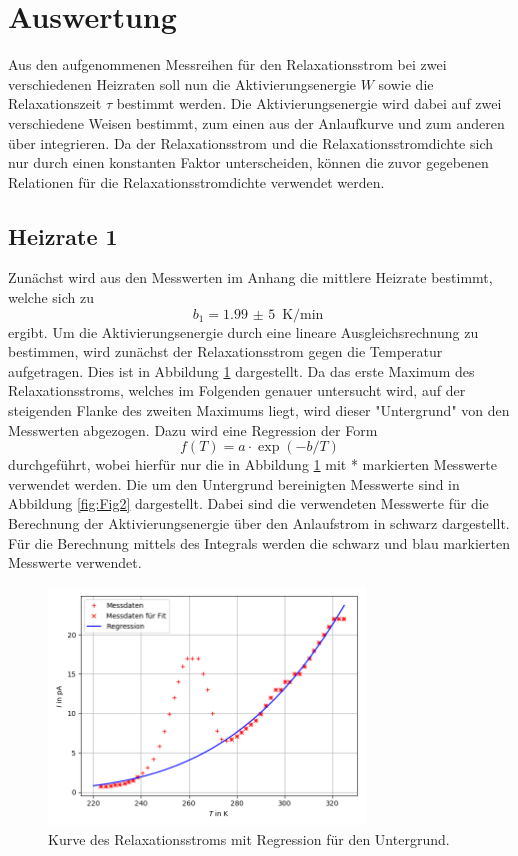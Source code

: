 \section{Auswertung}
Aus den aufgenommenen Messreihen für den Relaxationsstrom bei zwei verschiedenen Heizraten soll
nun die Aktivierungsenergie $W$ sowie die Relaxationszeit $\tau$ bestimmt werden. Die Aktivierungsenergie
wird dabei auf zwei verschiedene Weisen bestimmt, zum einen aus der Anlaufkurve und zum anderen
über integrieren. Da der Relaxationsstrom und die Relaxationsstromdichte sich nur durch einen
konstanten Faktor unterscheiden, können die zuvor gegebenen Relationen für die Relaxationsstromdichte
verwendet werden.

\subsection{Heizrate 1}
Zunächst wird aus den Messwerten im Anhang die mittlere Heizrate bestimmt, welche
sich zu
\begin{equation}
  b_1=\SI{1,99(5)}{\K\per\min}
\end{equation}
ergibt.
Um die Aktivierungsenergie durch eine lineare Ausgleichsrechnung zu bestimmen, wird zunächst
der Relaxationsstrom gegen die Temperatur aufgetragen. Dies ist in Abbildung \ref{fig:Fig1}
dargestellt. Da das erste Maximum des Relaxationsstroms,
welches im Folgenden genauer untersucht wird, auf der steigenden Flanke des zweiten Maximums
liegt, wird dieser "Untergrund" von den Messwerten abgezogen. Dazu wird eine Regression der
Form
\begin{equation}
  f(T)=a\cdot\exp(-b/T)
\end{equation}
durchgeführt, wobei hierfür nur die in Abbildung \ref{fig:Fig1} mit * markierten Messwerte verwendet werden.
Die um den Untergrund bereinigten Messwerte sind in Abbildung \ref{fig:Fig2} dargestellt. Dabei sind die
verwendeten Messwerte für die Berechnung der Aktivierungsenergie über den Anlaufstrom in schwarz dargestellt.
Für die Berechnung mittels des Integrals werden die schwarz und blau markierten Messwerte verwendet.

\begin{figure}[H]
  \centering
  \includegraphics[width=0.75\textwidth]{Dipol1mitUntergrund.png}
  \caption{Kurve des Relaxationsstroms mit Regression für den Untergrund.}
  \label{fig:Fig1}
\end{figure}

